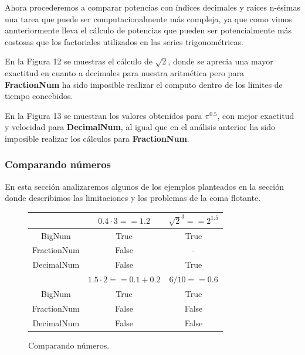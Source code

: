 \documentclass[a4paper,10pt,twocolumn]{article}
\begin{document}
	Ahora procederemos a comparar potencias con índices decimales y raíces n-ésimas una tarea que puede ser computacionalmente más compleja, ya que como vimos annteriormente lleva el cálculo de potencias que pueden ser potencialmente más costosas que los factoriales utilizados en las series trigonométricas.
	
	En la Figura 12 se muestras el cálculo de $\sqrt{2}$, donde se aprecia una mayor exactitud en cuanto a decimales para nuestra aritmética pero para \textbf{FractionNum} ha sido imposible realizar el computo dentro de los límites de tiempo concebidos.
	
	En la Figura 13 se muestran los valores obtenidos para $\pi^{0.5}$, con mejor exactitud y velocidad para \textbf{DecimalNum}, al igual que en el análisis anterior ha sido imposible realizar los cálculos para \textbf{FractionNum}.
	
\subsubsection{Comparando números}\label{sub:number_comp}

	En esta sección analizaremos algunos de los ejemplos planteados en la sección donde describimos las limitaciones y los problemas de la coma flotante.
	
	\begin{figure}[h!]%
		\begin{center}
			\begin{tabular}{|c|c|c|} \hline
			 			 & $0.4\cdot 3==1.2$ 	    & $\sqrt{2}^3==2^{1.5}$ 	\\ \hline
			BigNum       &  True  & True     \\ \hline
			FractionNum  &  False &   -   \\ \hline
			DecimalNum   &  False & True   \\ \hline
						& $1.5\cdot 2==0.1+0.2$ 	    & $6/10==0.6$	\\ \hline
			BigNum       &  True  & True     \\ \hline
			FractionNum  &  False & False  \\ \hline
			DecimalNum   &  False & False  \\ \hline

\end{tabular}
		\caption{Comparando números. \label{fig:ex}}
		\end{center}
	\end{figure}
	
\end{document}
